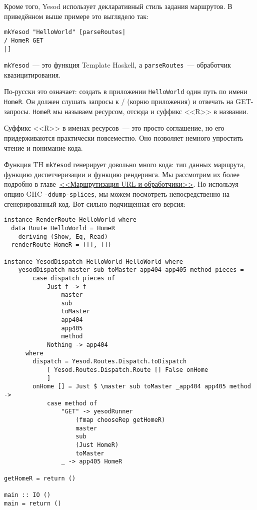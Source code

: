 Кроме того, Yesod использует декларативный стиль задания маршрутов. В приведённом выше
примере это выглядело так:

\begin{lstlisting}
mkYesod "HelloWorld" [parseRoutes|
/ HomeR GET
|]
\end{lstlisting}

\begin{remark}
  \lstinline!mkYesod!~--- это функция Template Haskell, а \lstinline!parseRoutes!~---
  обработчик квазицитирования.
\end{remark}

По-русски это означает: создать в приложении \texttt{HelloWorld} один путь по имени
\lstinline!HomeR!. Он должен слушать запросы к / (корню приложения) и отвечать на
GET-запросы. \lstinline!HomeR! мы называем ресурсом, отсюда и суффикс <<R>> в названии.

\begin{remark}
  Суффикс <<R>> в именах ресурсов~--- это просто соглашение, но его придерживаются
  практически повсеместно. Оно позволяет немного упростить чтение и понимание кода.
\end{remark}

Функция TH \lstinline!mkYesod! генерирует довольно много кода: тип данных маршрута,
функцию диспетчеризации и функцию рендеринга. Мы рассмотрим их более подробно в
главе~\hyperref[chap:routing]{<<Маршрутизация URL и обработчики>>}. Но используя опцию GHC
\lstinline'-ddump-splices', мы можем посмотреть непосредственно на сгенерированный
код. Вот сильно подчищенная его версия:

\begin{lstlisting}
instance RenderRoute HelloWorld where
  data Route HelloWorld = HomeR
    deriving (Show, Eq, Read)
  renderRoute HomeR = ([], [])

instance YesodDispatch HelloWorld HelloWorld where
    yesodDispatch master sub toMaster app404 app405 method pieces =
        case dispatch pieces of
            Just f -> f
                master
                sub
                toMaster
                app404
                app405
                method
            Nothing -> app404
      where
        dispatch = Yesod.Routes.Dispatch.toDispatch
            [ Yesod.Routes.Dispatch.Route [] False onHome
            ]
        onHome [] = Just $ \master sub toMaster _app404 app405 method ->
            case method of
                "GET" -> yesodRunner
                    (fmap chooseRep getHomeR)
                    master
                    sub
                    (Just HomeR)
                    toMaster
                _ -> app405 HomeR

getHomeR = return ()

main :: IO ()
main = return ()
\end{lstlisting}

